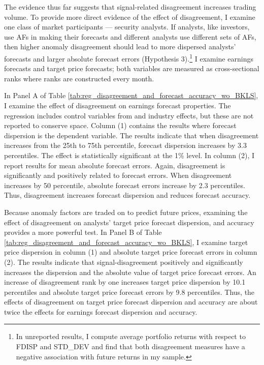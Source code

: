 \documentclass[
  12pt,
  a4paper,
  twoside,
  onecolumn]{article}
\begin{document}
The evidence thus far suggests that signal-related disagreement
increases trading volume. To provide more direct evidence of the effect
of disagreement, I examine one class of market participants --- security
analysts. If analysts, like investors, use AFs in making their forecasts
and different analysts use different sets of AFs, then higher anomaly
disagreement should lead to more dispersed analysts' forecasts and
larger absolute forecast errors (Hypothesis 3).\footnote{In unreported
  results, I compute average portfolio returns with respect to FDISP and
  STD\_DEV and find that both disagreement measures have a negative
  association with future returns in my sample.} I examine earnings
forecasts and target price forecasts; both variables are measured as
cross-sectional ranks where ranks are constructed every month.

In Panel A of Table
\ref{tab:reg_disagreement_and_forecast_accuracy_wo_BKLS}, I examine the
effect of disagreement on earnings forecast properties. The regression
includes control variables from \cite{liu_etal2012} and industry
effects, but these are not reported to conserve space. Column (1)
contains the results where forecast dispersion is the dependent
variable. The results indicate that when disagreement increases from the
25th to 75th percentile, forecast dispersion increases by 3.3
percentiles. The effect is statistically significant at the 1\% level.
In column (2), I report results for mean absolute forecast errors.
Again, disagreement is significantly and positively related to forecast
errors. When disagreement increases by 50 percentile, absolute forecast
errors increase by 2.3 percentiles. Thus, disagreement increases
forecast dispersion and reduces forecast accuracy.

Because anomaly factors are traded on to predict future prices,
examining the effect of disagreement on analysts' target price forecast
dispersion, and accuracy provides a more powerful test. In Panel B of
Table \ref{tab:reg_disagreement_and_forecast_accuracy_wo_BKLS}, I
examine target price dispersion in column (1) and absolute target price
forecast errors in column (2). The results indicate that
signal-disagreement positively and significantly increases the
dispersion and the absolute value of target price forecast errors. An
increase of disagreement rank by one increases target price dispersion
by 10.1 percentiles and absolute target price forecast errors by 9.8
percentiles. Thus, the effects of disagreement on target price forecast
dispersion and accuracy are about twice the effects for earnings
forecast dispersion and accuracy.
\end{document}

